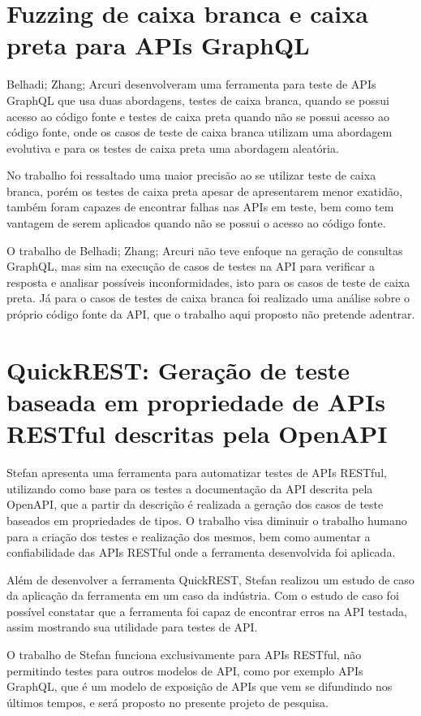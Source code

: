 \section{Fuzzing de caixa branca e caixa preta para APIs GraphQL}
Belhadi; Zhang; Arcuri \cite{belhadi2022} desenvolveram uma ferramenta para teste de APIs GraphQL que usa duas abordagens, testes de caixa branca, quando se possui acesso ao código fonte e testes de caixa preta quando não se possui acesso ao código fonte, onde os casos de teste de caixa branca utilizam uma abordagem evolutiva e para os testes de caixa preta uma abordagem aleatória.

No trabalho foi ressaltado uma maior precisão ao se utilizar teste de caixa branca, porém os testes de caixa preta apesar de apresentarem menor exatidão, também foram capazes de encontrar falhas nas APIs em teste, bem como tem vantagem de serem aplicados quando não se possui o acesso ao código fonte.

O trabalho de Belhadi; Zhang; Arcuri \cite{belhadi2022} não teve enfoque na geração de consultas GraphQL, mas sim na execução de casos de testes na API para verificar a resposta e analisar possíveis inconformidades, isto para os casos de teste de caixa preta. Já para o casos de testes de caixa branca foi realizado uma análise sobre o próprio código fonte da API, que o trabalho aqui proposto não pretende adentrar.

\section{QuickREST: Geração de teste baseada em propriedade de APIs RESTful descritas pela OpenAPI}
Stefan \cite{karlsson2020rest} apresenta uma ferramenta para automatizar testes de APIs RESTful, utilizando como base para os testes a documentação da API descrita pela OpenAPI, que a partir da descrição é realizada a geração dos casos de teste baseados em propriedades de tipos. O trabalho visa diminuir o trabalho humano para a criação dos testes e realização dos mesmos, bem como aumentar a confiabilidade das APIs RESTful onde a ferramenta desenvolvida foi aplicada.

Além de desenvolver a ferramenta QuickREST, Stefan \cite{karlsson2020rest} realizou um estudo de caso da aplicação da ferramenta em um caso da indústria. Com o estudo de caso foi possível constatar que a ferramenta foi capaz de encontrar erros na API testada, assim mostrando sua utilidade para testes de API.

O trabalho de Stefan \cite{karlsson2020rest} funciona exclusivamente para APIs RESTful, não permitindo testes para outros modelos de API, como por exemplo APIs GraphQL, que é um modelo de exposição de APIs que vem se difundindo nos últimos tempos, e será proposto no presente projeto de pesquisa.
